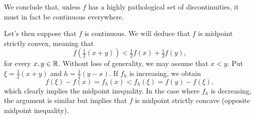 \begin{solution}
    We conclude that, unless $f$ has a highly pathological set of discontinuities, it must in fact be continuous everywhere.

    Let's then suppose that $f$ is continuous. We will deduce that $f$ is midpoint strictly convex, meaning that
    $$
        f(\tfrac12(x+y)) < \tfrac12f(x)+\tfrac12f(y),
    $$
    for every $x,y\in\mathbb{R}$. Without loss of generality, we may assume that $x<y$. Put $\xi=\frac12(x+y)$ and $h=\frac12(y-x)$. If $f_h$ is increasing, we obtain
    $$
        f(\xi)-f(x) = f_h(x) < f_h(\xi) = f(y)-f(\xi),
    $$
    which clearly implies the midpoint inequality. In the case where $f_h$ is decreasing, the argument is similar but implies that $f$ is midpoint strictly concave (opposite midpoint inequality).
    
    


    
\end{solution}
